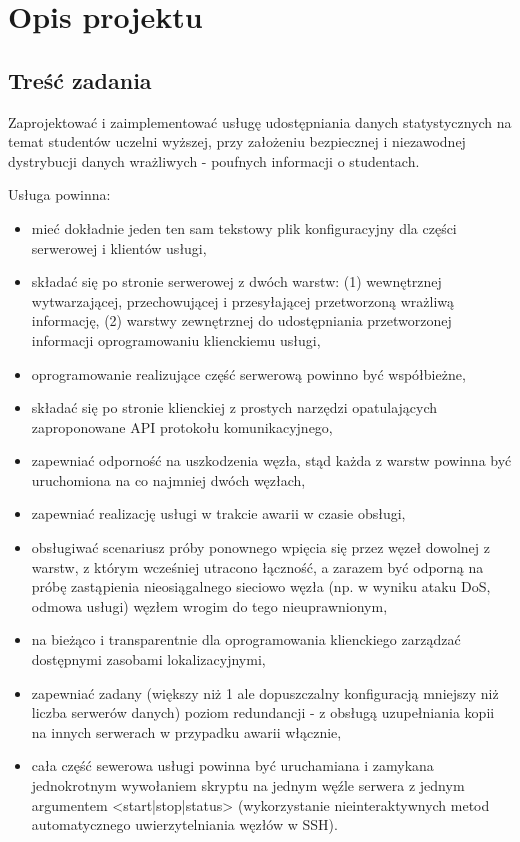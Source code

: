 \chapter[Opis projektu]{Opis projektu}

\section[Treść zadania]{Treść zadania}

\par{Zaprojektować i zaimplementować usługę udostępniania danych statystycznych na temat studentów uczelni wyższej, przy założeniu bezpiecznej i niezawodnej dystrybucji danych wrażliwych - poufnych informacji o studentach.}

\par{Usługa powinna:}
\begin{itemize}


\item mieć dokładnie jeden ten sam tekstowy plik konfiguracyjny dla części 
serwerowej i klientów usługi,
\item składać się po stronie serwerowej z dwóch warstw: (1)  wewnętrznej
  wytwarzającej, przechowującej i przesyłającej przetworzoną wrażliwą
informację, (2) warstwy zewnętrznej do udostępniania przetworzonej informacji
oprogramowaniu klienckiemu usługi,
\item oprogramowanie realizujące część serwerową powinno być współbieżne,
\item składać się po stronie klienckiej z prostych narzędzi opatulających
  zaproponowane API protokołu komunikacyjnego,
\item zapewniać odporność na uszkodzenia węzła, stąd każda z warstw powinna być
  uruchomiona na co najmniej dwóch węzłach,
\item zapewniać realizację usługi w trakcie awarii w czasie obsługi,
\item obsługiwać scenariusz próby ponownego wpięcia się przez węzeł dowolnej z
  warstw, z którym wcześniej utracono łączność, a zarazem być odporną na próbę
zastąpienia nieosiągalnego sieciowo węzła (np. w wyniku ataku DoS, odmowa
usługi) węzłem wrogim do tego nieuprawnionym,
\item na bieżąco i transparentnie dla oprogramowania klienckiego zarządzać
  dostępnymi zasobami lokalizacyjnymi,
\item zapewniać zadany (większy niż 1 ale dopuszczalny konfiguracją mniejszy niż
  liczba serwerów danych) poziom redundancji - z obsługą uzupełniania kopii na
innych serwerach w przypadku awarii włącznie,
\item cała część sewerowa usługi powinna być uruchamiana i zamykana jednokrotnym
  wywołaniem skryptu na jednym węźle serwera z jednym argumentem
<start|stop|status> (wykorzystanie nieinteraktywnych metod automatycznego
uwierzytelniania węzłów w SSH).

\end{itemize}

